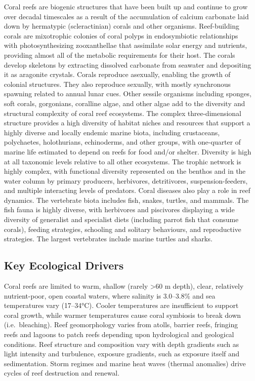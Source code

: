 \documentclass[
  letterpaper,
  DIV=11,
  numbers=noendperiod]{scrartcl}
\begin{document}
Coral reefs are biogenic structures that have been built up and continue
to grow over decadal timescales as a result of the accumulation of
calcium carbonate laid down by hermatypic (scleractinian) corals and
other organisms. Reef-building corals are mixotrophic colonies of coral
polyps in endosymbiotic relationships with photosynthesizing
zooxanthellae that assimilate solar energy and nutrients, providing
almost all of the metabolic requirements for their host. The corals
develop skeletons by extracting dissolved carbonate from seawater and
depositing it as aragonite crystals. Corals reproduce asexually,
enabling the growth of colonial structures. They also reproduce
sexually, with mostly synchronous spawning related to annual lunar cues.
Other sessile organisms including sponges, soft corals, gorgonians,
coralline algae, and other algae add to the diversity and structural
complexity of coral reef ecosystems. The complex three-dimensional
structure provides a high diversity of habitat niches and resources that
support a highly diverse and locally endemic marine biota, including
crustaceans, polychaetes, holothurians, echinoderms, and other groups,
with one-quarter of marine life estimated to depend on reefs for food
and/or shelter. Diversity is high at all taxonomic levels relative to
all other ecosystems. The trophic network is highly complex, with
functional diversity represented on the benthos and in the water column
by primary producers, herbivores, detritivores, suspension-feeders, and
multiple interacting levels of predators. Coral diseases also play a
role in reef dynamics. The vertebrate biota includes fish, snakes,
turtles, and mammals. The fish fauna is highly diverse, with herbivores
and piscivores displaying a wide diversity of generalist and specialist
diets (including parrot fish that consume corals), feeding strategies,
schooling and solitary behaviours, and reproductive strategies. The
largest vertebrates include marine turtles and sharks.

\subsection{Key Ecological Drivers}\label{key-ecological-drivers-28}

Coral reefs are limited to warm, shallow (rarely \textgreater60 m
depth), clear, relatively nutrient-poor, open coastal waters, where
salinity is 3.0--3.8\% and sea temperatures vary (17--34°C). Cooler
temperatures are insufficient to support coral growth, while warmer
temperatures cause coral symbiosis to break down (i.e.~bleaching). Reef
geomorphology varies from atolls, barrier reefs, fringing reefs and
lagoons to patch reefs depending upon hydrological and geological
conditions. Reef structure and composition vary with depth gradients
such as light intensity and turbulence, exposure gradients, such as
exposure itself and sedimentation. Storm regimes and marine heat waves
(thermal anomalies) drive cycles of reef destruction and renewal.
\end{document}
